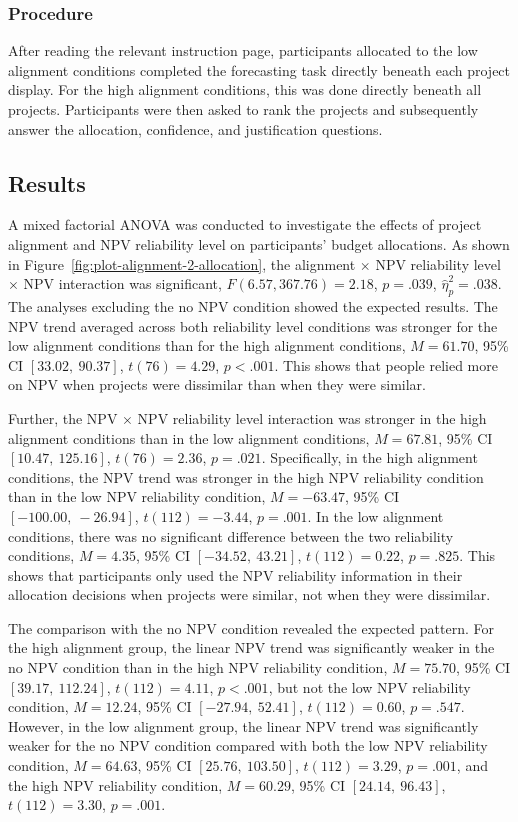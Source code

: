 \documentclass[a4paper, nobind]{templates/ociamthesis}
\theoremstyle{definition}
\theoremstyle{definition}
\theoremstyle{definition}
\theoremstyle{definition}
\theoremstyle{remark}
\begin{document}
\subsubsection{Procedure}

After reading the relevant instruction page, participants allocated to the low
alignment conditions completed the forecasting task directly beneath each
project display. For the high alignment conditions, this was done directly
beneath all projects. Participants were then asked to rank the projects and
subsequently answer the allocation, confidence, and justification questions.

\subsection{Results}

A mixed factorial ANOVA was conducted to investigate the effects of project
alignment and NPV reliability level on participants' budget allocations. As
shown in Figure~\ref{fig:plot-alignment-2-allocation}, the alignment \(\times\)
NPV reliability level \(\times\) NPV interaction was significant,
\(F(6.57, 367.76) = 2.18\), \(p = .039\), \(\hat{\eta}^2_p = .038\). The
analyses excluding the no NPV condition showed the expected results. The NPV
trend averaged across both reliability level conditions was stronger for the low
alignment conditions than for the high alignment conditions,
\(M = 61.70\), 95\% CI \([33.02,~90.37]\), \(t(76) = 4.29\), \(p < .001\). This shows that people
relied more on NPV when projects were dissimilar than when they were similar.

Further, the NPV \(\times\) NPV reliability level interaction was stronger in the high
alignment conditions than in the low alignment conditions,
\(M = 67.81\), 95\% CI \([10.47,~125.16]\), \(t(76) = 2.36\), \(p = .021\). Specifically, in
the high alignment conditions, the NPV trend was stronger in the high NPV
reliability condition than in the low NPV reliability condition,
\(M = -63.47\), 95\% CI \([-100.00,~-26.94]\), \(t(112) = -3.44\), \(p = .001\). In the low alignment
conditions, there was no significant difference between the two
reliability conditions, \(M = 4.35\), 95\% CI \([-34.52,~43.21]\), \(t(112) = 0.22\), \(p = .825\).
This shows that participants only used the NPV reliability information in their
allocation decisions when projects were similar, not when they were dissimilar.

The comparison with the no NPV condition revealed the expected pattern. For the
high alignment group, the linear NPV trend was significantly weaker in the no
NPV condition than in the high NPV reliability condition,
\(M = 75.70\), 95\% CI \([39.17,~112.24]\), \(t(112) = 4.11\), \(p < .001\), but not the low
NPV reliability condition, \(M = 12.24\), 95\% CI \([-27.94,~52.41]\), \(t(112) = 0.60\), \(p = .547\).
However, in the low alignment group, the linear NPV trend was significantly
weaker for the no NPV condition compared with both the low NPV reliability
condition, \(M = 64.63\), 95\% CI \([25.76,~103.50]\), \(t(112) = 3.29\), \(p = .001\),
and the high NPV reliability condition,
\(M = 60.29\), 95\% CI \([24.14,~96.43]\), \(t(112) = 3.30\), \(p = .001\).
\end{document}
